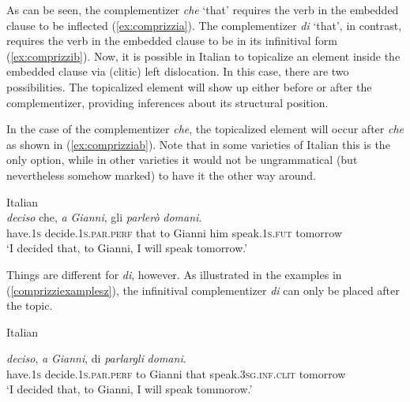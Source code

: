 \noindent As can be seen, the complementizer \textit{che} `that' requires the verb in the embedded clause to be inflected (\ref{ex:comprizzia}). The complementizer \textit{di} `that', in contrast, requires the verb in the embedded clause to be in its infinitival form (\ref{ex:comprizzib}). Now, it is possible in Italian to topicalize an element inside the embedded clause via (clitic) left dislocation. In this case, there are two possibilities. The topicalized element will show up either before or after the complementizer, providing inferences about its structural position.

In the case of the complementizer \textit{che}, the topicalized element will occur after \textit{che} as shown in (\ref{ex:comprizziab}). Note that in some varieties of Italian this is the only option, while in other varieties it would not be ungrammatical (but nevertheless somehow marked) to have it the other way around.

\begin{exe}
\ex Italian \citep[205]{rizzi2013notes} \\  {\textit{deciso}} {che,} {\textit{a}} {\textit{Gianni},} {gli} {\textit{parlerò}}  {\textit{domani}.} \\
{have.\textsc{1s}} {decide.\textsc{1s.par.perf}} {that} {to} {Gianni} {him} {speak.\textsc{1s.fut}}  {tomorrow} \\
\trans `I decided that, to Gianni, I will speak tomorrow.' \label{ex:comprizziab}
\end{exe}

\noindent Things are different for \textit{di}, however. As illustrated in the examples in (\ref{comprizziexamplesz}), the infinitival complementizer \textit{di} can only be placed after the topic.

\begin{exe}
\ex Italian \citep[205]{rizzi2013notes} \label{comprizziexamplesz}\begin{xlist}
\ex {} {\textit{deciso},} {\textit{a}} {\textit{Gianni},} {di} {\textit{parlargli}} {\textit{domani}.} \\
{have.\textsc{1s}} {decide.\textsc{1s.par.perf}} {to} {Gianni} {that} {speak.\textsc{3sg.inf}.\textsc{clit}} {tomorrow} \\
\trans `I decided that, to Gianni, I will speak tommorow.' \label{ex:comprizziabz}
\end{xlist}
\end{exe}

